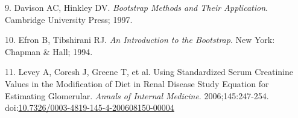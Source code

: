 \documentclass[11pt,]{article}
\begin{document}
\hypertarget{ref-Davison2013}{}
9. Davison AC, Hinkley DV. \emph{Bootstrap Methods and Their
Application}. Cambridge University Press; 1997.

\hypertarget{ref-Efron1994}{}
10. Efron B, Tibshirani RJ. \emph{An Introduction to the Bootstrap}. New
York: Chapman \& Hall; 1994.

\hypertarget{ref-Levey2006}{}
11. Levey A, Coresh J, Greene T, et al. Using Standardized Serum
Creatinine Values in the Modification of Diet in Renal Disease Study
Equation for Estimating Glomerular. \emph{Annals of Internal Medicine}.
2006;145:247-254.
doi:\href{https://doi.org/10.7326/0003-4819-145-4-200608150-00004}{10.7326/0003-4819-145-4-200608150-00004}
\end{document}
